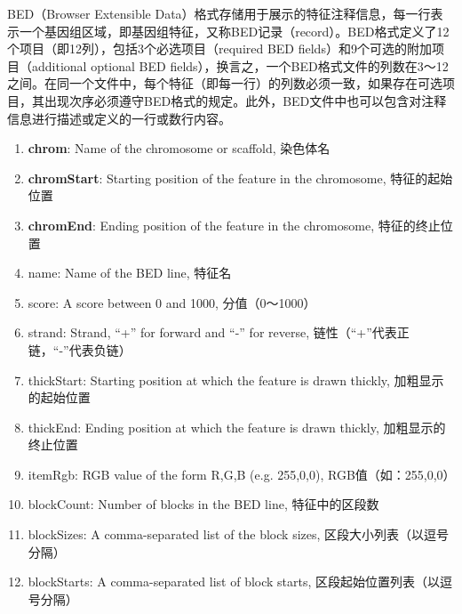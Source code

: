 BED（Browser Extensible Data）格式存储用于展示的特征注释信息，每一行表示一个基因组区域，即基因组特征，又称BED记录（record）。BED格式定义了12个项目（即12列），包括3个必选项目（required BED fields）和9个可选的附加项目（additional optional BED fields），换言之，一个BED格式文件的列数在3～12之间。在同一个文件中，每个特征（即每一行）的列数必须一致，如果存在可选项目，其出现次序必须遵守BED格式的规定。此外，BED文件中也可以包含对注释信息进行描述或定义的一行或数行内容。
\begin{enumerate}
	\item \textbf{chrom}: Name of the chromosome or scaffold, 染色体名
	\item \textbf{chromStart}: Starting position of the feature in the chromosome, 特征的起始位置
	\item \textbf{chromEnd}: Ending position of the feature in the chromosome, 特征的终止位置
	\item name: Name of the BED line, 特征名
	\item score: A score between 0 and 1000, 分值（0～1000）
	\item strand: Strand, ``+'' for forward and ``-'' for reverse, 链性（“+”代表正链，“-”代表负链）
	\item thickStart: Starting position at which the feature is drawn thickly, 加粗显示的起始位置
	\item thickEnd: Ending position at which the feature is drawn thickly, 加粗显示的终止位置
	\item itemRgb: RGB value of the form R,G,B (e.g. 255,0,0), RGB值（如：255,0,0）
	\item blockCount: Number of blocks in the BED line, 特征中的区段数
	\item blockSizes: A comma-separated list of the block sizes, 区段大小列表（以逗号分隔）
	\item blockStarts: A comma-separated list of block starts, 区段起始位置列表（以逗号分隔）
\end{enumerate}

